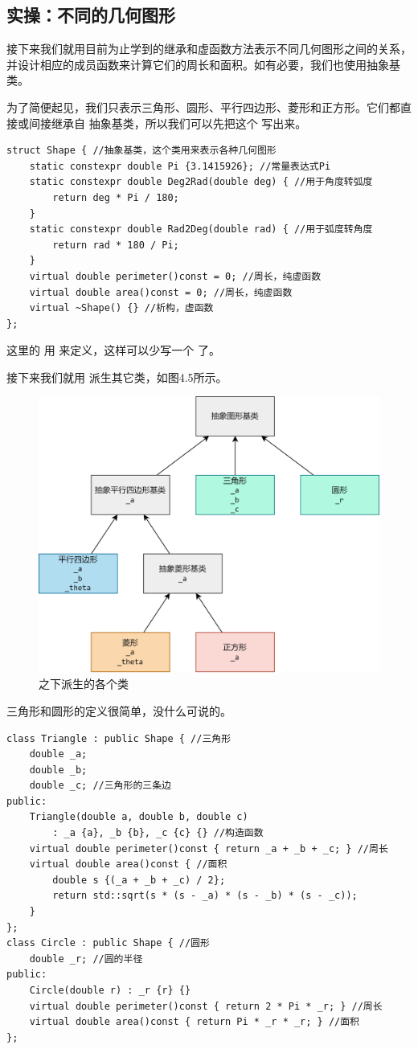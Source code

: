 \subsection*{实操：不同的几何图形}
接下来我们就用目前为止学到的继承和虚函数方法表示不同几何图形之间的关系，并设计相应的成员函数来计算它们的周长和面积。如有必要，我们也使用抽象基类。\par
为了简便起见，我们只表示三角形、圆形、平行四边形、菱形和正方形。它们都直接或间接继承自 \lstinline@Shape@ 抽象基类，所以我们可以先把这个 \lstinline@Shape@ 写出来。
\begin{lstlisting}
struct Shape { //抽象基类，这个类用来表示各种几何图形
    static constexpr double Pi {3.1415926}; //常量表达式Pi
    static constexpr double Deg2Rad(double deg) { //用于角度转弧度
        return deg * Pi / 180;
    }
    static constexpr double Rad2Deg(double rad) { //用于弧度转角度
        return rad * 180 / Pi;
    }
    virtual double perimeter()const = 0; //周长，纯虚函数
    virtual double area()const = 0; //周长，纯虚函数
    virtual ~Shape() {} //析构，虚函数
};
\end{lstlisting}
这里的 \lstinline@Shape@ 用 \lstinline@struct@ 来定义，这样可以少写一个 \lstinline@public@ 了。\par
接下来我们就用 \lstinline@Shape@ 派生其它类，如图4.5所示。\par
\begin{figure}[htbp]
    \centering
    \includegraphics[width=.8\textwidth]{../images/generalized_parts/10_abstract_shape_class_300.png}
    \caption{\lstinline@Shape@ 之下派生的各个类}
\end{figure}
三角形和圆形的定义很简单，没什么可说的。
\begin{lstlisting}
class Triangle : public Shape { //三角形
    double _a;
    double _b;
    double _c; //三角形的三条边
public:
    Triangle(double a, double b, double c)
        : _a {a}, _b {b}, _c {c} {} //构造函数
    virtual double perimeter()const { return _a + _b + _c; } //周长
    virtual double area()const { //面积
        double s {(_a + _b + _c) / 2};
        return std::sqrt(s * (s - _a) * (s - _b) * (s - _c));
    }
};
class Circle : public Shape { //圆形
    double _r; //圆的半径
public:
    Circle(double r) : _r {r} {}
    virtual double perimeter()const { return 2 * Pi * _r; } //周长
    virtual double area()const { return Pi * _r * _r; } //面积
};
\end{lstlisting}
